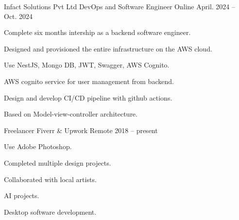 

\begin{cventries}

  \cventry
    {Infact Solutions Pvt Ltd} %
    {DevOps and Software Engineer} %
    {Online} %
    {April. 2024 -- Oct. 2024} %
    {
      \begin{cvitems} %
        \item {Complete six months intership as a backend software engineer.}
        \item {Designed and provisioned the entire infrastructure on the AWS cloud.}
        \item {Use NestJS, Mongo DB, JWT, Swagger, AWS Cognito.}
        \item {AWS cognito service for user management from backend.}
        \item {Design and develop CI/CD pipeline with github actions.}
        \item {Based on Model-view-controller architecture.}
      \end{cvitems}
    }

  \cventry
    {Freelancer} %
    {Fiverr \& Upwork} %
    {Remote} %
    {2018 -- present} %
    {
      \begin{cvitems} %
        \item {Use Adobe Photoshop.}
        \item {Completed multiple design projects.}
        \item {Collaborated with local artists.}
        \item {AI projects.}
        \item {Desktop software development.}
      \end{cvitems}
    }


\end{cventries}

